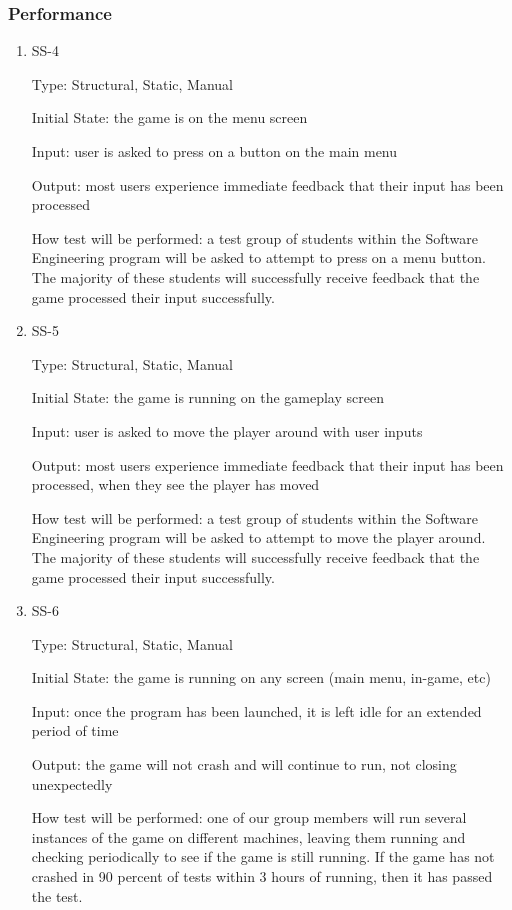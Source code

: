 \documentclass[12pt, titlepage]{article}
\begin{document}
\subsubsection{Performance}

\begin{enumerate}
\item{SS-4}

Type: Structural, Static, Manual
					
Initial State: the game is on the menu screen
					
Input: user is asked to press on a button on the main menu
					
Output: most users experience immediate feedback that their input has been processed
					
How test will be performed: a test group of students within the Software Engineering program will be asked to attempt to press on a menu button. The majority of these students will successfully receive feedback that the game processed their input successfully.

\item{SS-5}

Type: Structural, Static, Manual
					
Initial State: the game is running on the gameplay screen
					
Input: user is asked to move the player around with user inputs
					
Output: most users experience immediate feedback that their input has been processed, when they see the player has moved
					
How test will be performed: a test group of students within the Software Engineering program will be asked to attempt to move the player around. The majority of these students will successfully receive feedback that the game processed their input successfully.

\item{SS-6}

Type: Structural, Static, Manual
					
Initial State: the game is running on any screen (main menu, in-game, etc)
					
Input: once the program has been launched, it is left idle for an extended period of time
					
Output: the game will not crash and will continue to run, not closing unexpectedly 
					
How test will be performed: one of our group members will run several instances of the game on different machines, leaving them running and checking periodically to see if the game is still running. If the game has not crashed in 90 percent of tests within 3 hours of running, then it has passed the test.

\end{enumerate}
\end{document}
